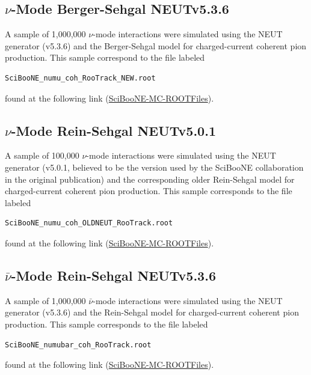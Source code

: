 \documentclass[11pt]{article}
\begin{document}
\subsection{$\nu$-Mode Berger-Sehgal NEUTv5.3.6}
\label{sub:NMBSv5.3.6}
A sample of 1,000,000 $\nu$-mode interactions were simulated using the NEUT generator (v5.3.6) and the Berger-Sehgal model for charged-current coherent pion production. This sample correspond to the file labeled
\begin{verbatim}
SciBooNE_numu_coh_RooTrack_NEW.root
\end{verbatim}
found at the following link (\href{https://drive.google.com/open?id=0B4rvJl9swUOxcEtpSl94RDRsc3c}{SciBooNE-MC-ROOTFiles}).



\subsection{$\nu$-Mode Rein-Sehgal NEUTv5.0.1}
\label{sub:NMRSv5.0.1}
A sample of 100,000 $\nu$-mode interactions were simulated using the NEUT generator (v5.0.1, believed to be the version used by the SciBooNE collaboration in the original publication) and the corresponding older Rein-Sehgal model for charged-current coherent pion production. This sample corresponds to the file labeled
\begin{verbatim}
SciBooNE_numu_coh_OLDNEUT_RooTrack.root
\end{verbatim}
found at the following link (\href{https://drive.google.com/open?id=0B4rvJl9swUOxcEtpSl94RDRsc3c}{SciBooNE-MC-ROOTFiles}).


\subsection{$\bar{\nu}$-Mode Rein-Sehgal NEUTv5.3.6}
\label{sub:ANMRSv5.3.6}
A sample of 1,000,000 $\bar{\nu}$-mode interactions were simulated using the NEUT generator (v5.3.6) and the Rein-Sehgal model for charged-current coherent pion production. This sample corresponds to the file labeled
\begin{verbatim}
SciBooNE_numubar_coh_RooTrack.root
\end{verbatim}
found at the following link (\href{https://drive.google.com/open?id=0B4rvJl9swUOxcEtpSl94RDRsc3c}{SciBooNE-MC-ROOTFiles}).
\end{document}
